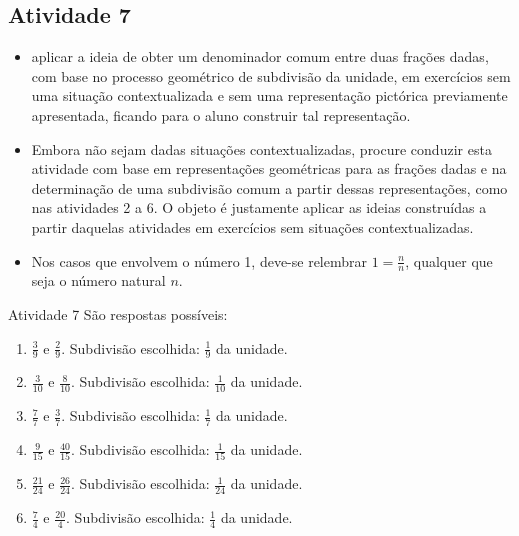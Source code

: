 \begin{multicols}{2}
\subsection{Atividade 7}

  \newline \vspace{.15cm}

  \begin{itemize} %
    \item       aplicar a ideia de obter um denominador comum entre duas frações dadas, com base no processo geométrico de subdivisão da unidade, em exercícios sem uma situação contextualizada e sem uma representação pictórica  previamente apresentada, ficando para o aluno construir tal representação.
 \end{itemize} %


   \vspace{.15cm}

  \begin{itemize} %
    \item       Embora não sejam dadas situações contextualizadas, procure conduzir esta atividade com base em representações geométricas para as frações dadas e na determinação de uma subdivisão comum a partir dessas representações, como nas atividades 2 a 6. O objeto é justamente aplicar as ideias construídas a partir daquelas atividades em exercícios sem situações contextualizadas.
    \item  Nos casos que envolvem o número 1, deve-se relembrar   $1 = \frac{n}{n}$, qualquer que seja o número natural $n$.
  \end{itemize} %

\begin{resposta*}{Atividade 7}
  São respostas possíveis:
\begin{enumerate} [\quad a)] %
    \item             $\frac{3}{9}$       e       $\frac{2}{9}$.        Subdivisão escolhida:       $\frac{1}{9}$       da unidade.
    \item             $\frac{3}{10}$       e       $\frac{8}{10}$.      Subdivisão escolhida:       $\frac{1}{10}$       da unidade.
    \item             $\frac{7}{7}$       e       $\frac{3}{7}$.        Subdivisão escolhida:       $\frac{1}{7}$       da unidade.
    \item             $\frac{9}{15}$       e       $\frac{40}{15}$.   Subdivisão escolhida:       $\frac{1}{15}$       da unidade.
    \item             $\frac{21}{24}$       e       $\frac{26}{24}$.    Subdivisão escolhida:       $\frac{1}{24}$       da unidade.
    \item             $\frac{7}{4}$       e       $\frac{20}{4}$.       Subdivisão escolhida:       $\frac{1}{4}$       da unidade.
\end{enumerate} %



\end{resposta*}
\end{multicols}

